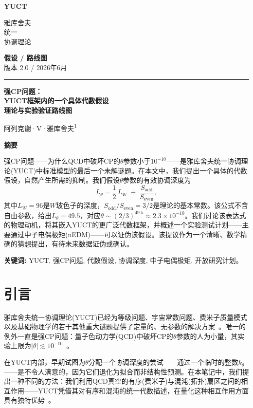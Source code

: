 \documentclass[12pt,a4paper]{article}
\newcommand{\makeheader}{%
	\noindent
	\begin{minipage}{0.17\textwidth}
		\raggedright
		{\sffamily\bfseries\color{skyblue}\fontsize{46}{46}\selectfont YUCT}%
	\end{minipage}%
	\hspace{30pt}
	\begin{minipage}{0.32\textwidth}
		\raggedright
		{\sffamily\fontsize{11}{13}\selectfont 雅库舍夫\\ 统一\\ 协调理论}%
	\end{minipage}%
	\hfill
	\begin{minipage}{0.38\textwidth}
		\raggedleft
		{\sffamily\bfseries 假设 / 路线图}\\ 
		{\sffamily 版本 2.0 / 2026年6月}\\ 
	\end{minipage}
	\par\vspace{5pt}
	\noindent\textcolor{gold}{\rule{\textwidth}{1.6pt}}
	\par\vspace{0pt}
}
\begin{document}
	\thispagestyle{firstpage}
	\makeheader
	
	\vspace{0cm}
	{\LARGE\bfseries 强CP问题：\\[0.1cm] YUCT框架内的一个具体代数假设\\[0.2cm] \Large 理论与实验验证路线图 \par}
	\vspace{0.2cm}
	
	{\large 阿列克谢·V·雅库舍夫\textsuperscript{1}} \\
	\vspace{0.0cm}
	
	{\color{darkblue}\textbf{\LARGE 摘要}} \par
	{\large
		\noindent
		强CP问题——为什么QCD中破坏CP的\(\theta\)参数小于\(10^{-10}\)——是雅库舍夫统一协调理论(YUCT)中标准模型的最后一个未解谜题。在本文中，我们提出一个具体的代数假设，自然产生所需的抑制。我们假设\(\theta\)参数的有效协调深度为
		\[
		L_\theta = \frac{1}{2}\,L_W \;+\; \frac{S_{\mathrm{odd}}}{S_{\mathrm{even}}},
		\]
		其中\(L_W = 96\)是\(W\)玻色子的深度，\(S_{\mathrm{odd}}/S_{\mathrm{even}} = 3/2\)是理论的基本常数。该公式不含自由参数，给出\(L_\theta = 49.5\)，对应\(\theta \sim (2/3)^{49.5} \approx 2.3 \times 10^{-10}\)。我们讨论该表达式的物理动机，将其嵌入YUCT的更广泛代数框架，并概述一个实验测试计划——主要通过中子电偶极矩(nEDM)——可以证伪该假设。该提议作为一个清晰、数学精确的猜想提出，有待未来数据证伪或确认。
	}
	
	\vspace{0.1cm}
	\noindent
	{\color{darkblue}\textbf{关键词:}} YUCT, 强CP问题, 代数假设, 协调深度, 中子电偶极矩, 开放研究计划。
	\vspace{0.4cm}
	
	\clearpage
	\tableofcontents
	\newpage
	
	\section{引言}
	\label{sec:intro}
	
	雅库舍夫统一协调理论(YUCT)已经为等级问题、宇宙常数问题、费米子质量模式以及基础物理学的若干其他重大谜题提供了定量的、无参数的解决方案~\cite{Y1,Y3,Y4}。唯一的例外一直是强CP问题：量子色动力学(QCD)中破坏CP的\(\theta\)参数的人为小量，其实验上限为\(|\theta| \lesssim 10^{-10}\)~\cite{nEDM2020}。
	
	在YUCT内部，早期试图为\(\theta\)分配一个协调深度的尝试——通过一个临时的整数\(k_\theta\)——是不令人满意的，因为它们退化为拟合而非结构性预测。在本笔记中，我们提出一种不同的方法：我们利用QCD真空的有序(费米子)与混沌(拓扑)扇区之间的相互作用——YUCT凭借其对有序和混沌的统一代数描述，在量化这种相互作用方面具有独特优势~\cite{Y2,Feig}。
	
\end{document}
